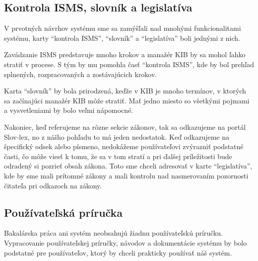 \subsection*{Kontrola ISMS, slovník a legislatíva}
V prvotných návrhov systému sme sa zamýšľali nad mnohými funkcionalitami systému, karty \enquote{kontrola ISMS},
\enquote{slovník} a \enquote{legislatíva} boli jednými z nich.

Zavádzanie ISMS predstavuje mnoho krokov a manažér KIB by sa mohol ľahko stratiť v procese. S tým by mu pomohla časť
\enquote{kontrola ISMS}, kde by bol prehľad splnených, rozpracovaných a zostávajúcich krokov.

Karta \enquote{slovník} by bola prirodzená, keďže v KIB je mnoho termínov, v ktorých sa začínajúci manažér KIB môže 
stratiť. Mať jedno miesto so všetkými pojmami a vysvetleniami by bolo veľmi nápomocné.

Nakoniec, keď referujeme na rôzne sekcie zákonov, tak sa odkazujeme na portál Slov-lex, no z nášho pohľadu to má 
jeden nedostatok. Keď odkazujeme na špecifický odsek alebo písmeno, nedokážeme používateľovi zvýrazniť podstatné časti,
čo môže viesť k tomu, že sa v tom stratí a pri ďalšej príležitosti bude odradený si pozrieť obsah zákona. Toto sme chceli
adresovať v karte \enquote{legislatíva}, kde by sme mali prítomné zákony a mali kontrolu nad nasmerovaním pozornosti
čitateľa pri odkazoch na zákony.


\subsection*{Používateľská príručka}
Bakalárska práca ani systém neobsahujú žiadnu používateľskú príručku. Vypracovanie používateľskej príručky, návodov a
dokumentácie systému by bolo podstatné pre používateľov, ktorý by chceli prakticky používať náš systém.



